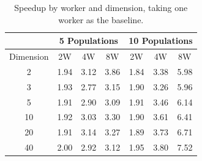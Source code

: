 \documentclass[review]{elsarticle}
\begin{document}
%
%
%
%
\begin{table}[h!tbp]
    \caption{Speedup by worker and dimension, taking one worker as the baseline.}
    \label{tab:speedup-table}
    \vspace{0.25cm}
    \centering

    \begin{tabular}{c|r|r|r|r|r|r|}
    \cline{2-7}
    \multicolumn{1}{l|}{}           & \multicolumn{3}{c|}{5 Populations}                                          & \multicolumn{3}{c|}{10 Populations}                                         \\ \hline
    \multicolumn{1}{|l|}{Dimension} & \multicolumn{1}{c|}{2W} & \multicolumn{1}{c|}{4W} & \multicolumn{1}{c|}{8W} & \multicolumn{1}{c|}{2W} & \multicolumn{1}{c|}{4W} & \multicolumn{1}{c|}{8W} \\ \hline
    \multicolumn{1}{|c|}{2}         & 1.94                    & 3.12                    & 3.86                    & 1.84                    & 3.38                    & 5.98                    \\ \hline
    \multicolumn{1}{|c|}{3}         & 1.93                    & 2.77                    & 3.15                    & 1.90                    & 3.26                    & 5.96                    \\ \hline
    \multicolumn{1}{|c|}{5}         & 1.91                    & 2.90                    & 3.09                    & 1.91                    & 3.46                    & 6.14                    \\ \hline
    \multicolumn{1}{|c|}{10}        & 1.92                    & 3.03                    & 3.30                    & 1.90                    & 3.61                    & 6.41                    \\ \hline
    \multicolumn{1}{|c|}{20}        & 1.91                    & 3.14                    & 3.27                    & 1.89                    & 3.73                    & 6.71                    \\ \hline
    \multicolumn{1}{|c|}{40}        & 2.00                    & 2.92                    & 3.12                    & 1.95                    & 3.80                    & 7.52                    \\ \hline
    \end{tabular}
\end{table}
\end{document}

